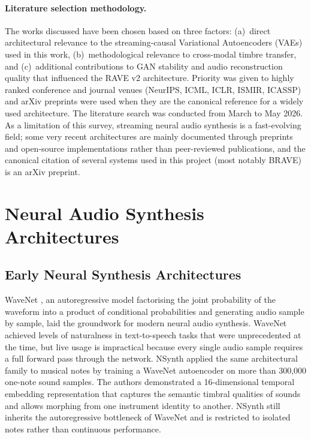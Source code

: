 \documentclass[a4paper,11pt,oneside,openany]{book}
\begin{document}
\paragraph{Literature selection methodology.} The works discussed have been chosen based on three factors: (a)~direct architectural relevance to the streaming-causal Variational Autoencoders (VAEs) used in this work, (b)~methodological relevance to cross-modal timbre transfer, and (c)~additional contributions to GAN stability and audio reconstruction quality that influenced the RAVE v2 architecture. Priority was given to highly ranked conference and journal venues (NeurIPS, ICML, ICLR, ISMIR, ICASSP) and arXiv preprints were used when they are the canonical reference for a widely used architecture. The literature search was conducted from March to May 2026. As a limitation of this survey, streaming neural audio synthesis is a fast-evolving field; some very recent architectures are mainly documented through preprints and open-source implementations rather than peer-reviewed publications, and the canonical citation of several systems used in this project (most notably BRAVE) is an arXiv preprint.

\section{Neural Audio Synthesis Architectures}\label{sec:nas_arch}

\subsection*{Early Neural Synthesis Architectures}

WaveNet \parencite{vandenoord2016wavenet}, an autoregressive model factorising the joint probability of the waveform into a product of conditional probabilities and generating audio sample by sample, laid the groundwork for modern neural audio synthesis. WaveNet achieved levels of naturalness in text-to-speech tasks that were unprecedented at the time, but live usage is impractical because every single audio sample requires a full forward pass through the network. NSynth \parencite{engel2017nsynth} applied the same architectural family to musical notes by training a WaveNet autoencoder on more than 300,000 one-note sound samples. The authors demonstrated a 16-dimensional temporal embedding representation that captures the semantic timbral qualities of sounds and allows morphing from one instrument identity to another. NSynth still inherits the autoregressive bottleneck of WaveNet and is restricted to isolated notes rather than continuous performance.
\end{document}
